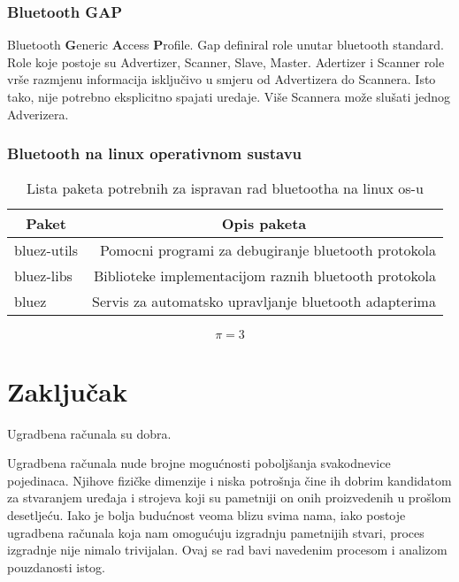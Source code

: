 \documentclass[times, utf8, diplomski]{fer}
\begin{document}
\subsection{Bluetooth GAP}
Bluetooth \textbf{G}eneric \textbf{A}ccess \textbf{P}rofile.
Gap definiral role unutar bluetooth standard. Role koje postoje su Advertizer, Scanner, Slave, Master. Adertizer i Scanner role vr\v{s}e razmjenu informacija isklju\v{c}ivo u smjeru
od Advertizera do Scannera. Isto tako, nije potrebno eksplicitno spajati uredaje.
Vi\v{s}e Scannera mo\v{z}e slu\v{s}ati jednog Adverizera.

\subsection{Bluetooth na linux operativnom sustavu}

\begin{table}[h]
  \begin{center}
    \begin{tabular}[c]{l|r}
      \multicolumn{1}{c|}{\textbf{Paket}} & 
      \multicolumn{1}{c}{\textbf{Opis paketa}} \\
      \hline
      bluez-utils & Pomocni programi za debugiranje bluetooth protokola \\
      bluez-libs & Biblioteke implementacijom raznih bluetooth protokola \\
      bluez & Servis za automatsko upravljanje bluetooth adapterima \\
      \hline
    \end{tabular}
  \caption{Lista paketa potrebnih za ispravan rad bluetootha na linux os-u}
  \end{center}
\end{table}


\begin{equation}
  \pi=3
\end{equation}

\chapter{Zaključak}
Ugradbena računala su dobra.




\begin{sazetak}
  Ugradbena ra\v{c}unala nude brojne mogućnosti poboljšanja svakodnevice pojedinaca. Njihove fizičke dimenzije i niska potrošnja čine ih dobrim kandidatom za stvaranjem uređaja i strojeva koji su pametniji on onih proizvedenih u prošlom desetljeću. Iako je bolja budućnost veoma blizu svima nama, iako postoje ugradbena računala koja nam omogućuju izgradnju pametnijih stvari, proces izgradnje nije nimalo trivijalan. Ovaj se rad bavi navedenim procesom i analizom pouzdanosti istog.

\end{sazetak}
\end{document}

